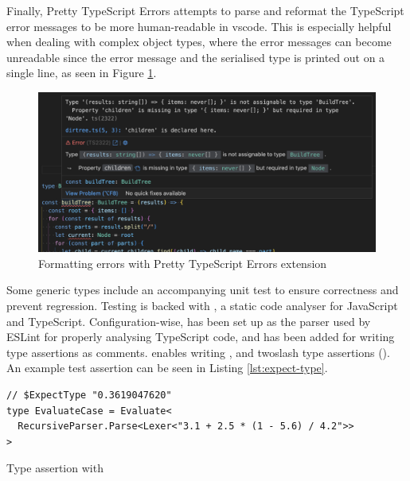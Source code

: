 Finally, Pretty TypeScript Errors \cite{balasianoPrettyTypeScriptErrors2023} attempts to parse and reformat the TypeScript error messages to be more human-readable in \acrshort{vscode}. This is especially helpful when dealing with complex object types, where the error messages can become unreadable since the error message and the serialised type is printed out on a single line, as seen in Figure \ref{fig:pretty-ts-errors}.


\begin{figure}[ht]
  \centering
  \includegraphics[width=\textwidth]{text/testing/pretty-ts-errors.png}
  \caption{Formatting errors with Pretty TypeScript Errors extension}
  \label{fig:pretty-ts-errors}
\end{figure}

Some generic types include an accompanying unit test to ensure correctness and prevent regression. Testing is backed with \cite{ESLint2023}, a static code analyser for JavaScript and TypeScript. Configuration-wise,  has been set up as the parser used by ESLint for properly analysing TypeScript code, and  has been added for writing type assertions as comments.  enables writing ,  and twoslash type assertions (). An example test assertion can be seen in Listing \ref{lst:expect-type}.

\begin{listing}[ht]
  \begin{verbatim}
// $ExpectType "0.3619047620"
type EvaluateCase = Evaluate<
  RecursiveParser.Parse<Lexer<"3.1 + 2.5 * (1 - 5.6) / 4.2">>
>
\end{verbatim}
  \caption{Type assertion with }\label{lst:expect-type}
\end{listing}
